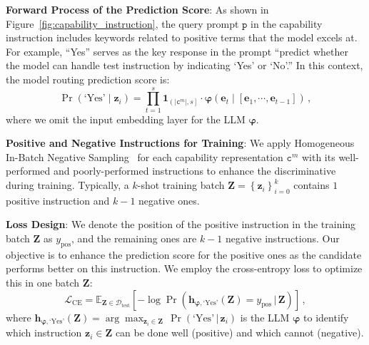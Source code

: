 \textbf{Forward Process of the Prediction Score}: As shown in Figure~\ref{fig:capability_instruction}, the query prompt $\texttt{p}$ in the capability instruction includes keywords related to positive terms that the model excels at. For example, ``Yes'' serves as the key response in the prompt ``predict whether the model can handle test instruction by indicating `Yes' or `No'.'' In this context, the model routing prediction score is:
\begin{equation}
    \operatorname{Pr}\left( \text{`Yes'} \mid \mathbf{z}_i \right) = \prod_{t=1}^{s} \mathbf{1}_{\left(|\texttt{c}^m|, s\right]} \cdot \boldsymbol{\varphi} \left( \mathbf{e}_t \mid \left[ \mathbf{e}_1, \cdots, \mathbf{e}_{t-1} \right] \right)\,,
\end{equation}
where we omit the input embedding layer for the LLM $\boldsymbol{\varphi}$.



\textbf{Positive and Negative Instructions for Training}:
We apply Homogeneous In-Batch Negative Sampling~\cite{DBLP:conf/emnlp/KarpukhinOMLWEC20,DBLP:journals/corr/abs-2310-07554} for each capability representation $\texttt{c}^m$ with its well-performed and poorly-performed instructions to enhance the discriminative during training.
Typically, a $k$-shot training batch $\mathbf{Z} = \left\{ \mathbf{z}_i \right\}_{i=0}^{k}$ contains $1$ positive instruction and $k-1$ negative ones.

\textbf{Loss Design}:
We denote the position of the positive instruction in the training batch $\mathbf{Z}$ as $y_{\text{pos}}$, and the remaining ones are $k-1$ negative instructions.
Our objective is to enhance the prediction score for the positive ones as the candidate performs better on this instruction.
We employ the cross-entropy loss to optimize this in one batch $\mathbf{Z}$:
\begin{equation}
    \mathcal{L}_{\text{CE}} = \mathbb{E}_{\mathbf{Z} \in \mathcal{D}_{\text{test}}} \left[ - \log \operatorname{Pr} \left(\boldsymbol{h}_{\boldsymbol{\varphi}, \text{`Yes'}}\left(\mathbf{Z}\right) = y_{\text{pos}} \, | \, \mathbf{Z} \right) \right]\,,
\end{equation}
where $\boldsymbol{h}_{\boldsymbol{\varphi}, \text{`Yes'}}\left(\mathbf{Z}\right) = \arg\max_{\mathbf{z}_i \in \mathbf{Z}} \, \operatorname{Pr} \left(\text{`Yes'} \, | \, \mathbf{z}_i \right)$ is the LLM $\boldsymbol{\varphi}$ to identify which instruction $\mathbf{z}_i \in \mathbf{Z}$ can be done well (positive) and which cannot (negative).

